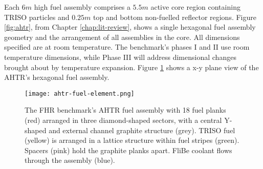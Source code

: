 Each $6m$ high fuel assembly comprises a $5.5m$ active core region containing
\gls{TRISO} particles and $0.25m$ top and bottom non-fuelled reflector regions.
Figure \ref{fig:ahtr}, from Chapter \ref{chap:lit-review}, shows a single 
hexagonal fuel assembly geometry and the arrangement of all assemblies in the core.
All dimensions specified are at room temperature. 
The benchmark's phases I and II use room temperature dimensions, while Phase III 
will address dimensional changes brought about by temperature expansion. 
Figure \ref{fig:ahtr-fuel-assembly} shows a x-y plane view of the 
\gls{AHTR}'s hexagonal fuel assembly. 
\begin{figure}[htbp]
    \centering
    \texttt{[image: ahtr-fuel-element.png]} 
            \hspace{0.5cm}
    \caption{The \acrfull{FHR} benchmark's \acrfull{AHTR} fuel assembly with 18 fuel 
    planks (red) arranged in three diamond-shaped sectors, with a central Y-shaped and 
    external channel graphite structure (grey). 
    TRISO fuel (yellow) is arranged in a lattice structure within fuel stripes (green). 
    Spacers (pink) hold the graphite planks apart. 
    FliBe coolant flows through the assembly (blue). }
    \label{fig:ahtr-fuel-assembly}
\end{figure}
